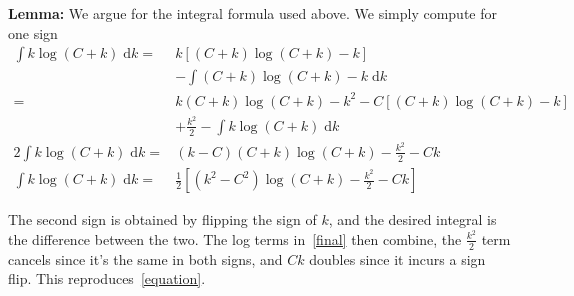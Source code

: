 \documentclass[12pt]{article}
\begin{document}
\textbf{Lemma:} We argue for the integral formula used above. We simply compute
for one sign
\begin{align}
    \int k \log(C + k)\;\mathrm{d}k ={}&
        k \left[ (C + k) \log (C + k) - k \right] \nonumber\\
    &- \int (C + k) \log (C + k) - k\;\mathrm{d}k \\
    ={}& k(C+k)\log(C+k) - k^2 - C\left[ (C + k) \log (C + k) - k \right]
        \nonumber\\
    &+ \frac{k^2}{2} - \int k\log(C+k)\;\mathrm{d}k\\
    2 \int k\log(C+k)\;\mathrm{d}k ={}&
        (k-C)(C+k)\log(C+k) - \frac{k^2}{2} - Ck\\
    \int k\log(C+k)\;\mathrm{d}k ={}&
        \frac{1}{2}\left[(k^2 - C^2)\log(C+k) - \frac{k^2}{2} - Ck\right]
        \label{final}
\end{align}

The second sign is obtained by flipping the sign of $k$, and the desired
integral is the difference between the two. The log terms in~\eqref{final} then
combine, the $\frac{k^2}{2}$ term cancels since it's the same in both signs, and
$Ck$ doubles since it incurs a sign flip. This reproduces~\eqref{equation}.
\end{document}
